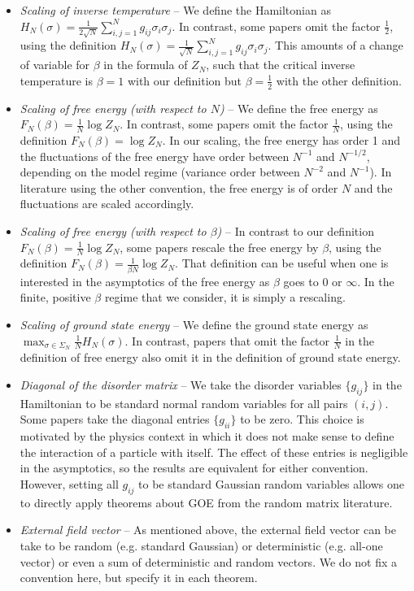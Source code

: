 \documentclass[11pt]{article}
\numberwithin{equation}{section}
\def \b {\beta}
\def \s {\sigma}
\theoremstyle{remark}
\begin{document}
\begin{itemize}
\item \textit{Scaling of inverse temperature} -- We define the Hamiltonian as $H_N(\s)=\frac1{2\sqrt N}\sum_{i,j=1}^N g_{ij}\s_i\s_j$.  In contrast, some papers omit the factor $\frac12$, using the definition $H_N(\s)=\frac1{\sqrt N}\sum_{i,j=1}^N g_{ij}\s_i\s_j$.  This amounts of a change of variable for $\b$ in the formula of $Z_N$, such that the critical inverse temperature is $\b=1$ with our definition but $\b=\frac12$ with the other definition.
\item \textit{Scaling of free energy (with respect to $N$)} -- We define the free energy as $F_N(\b)=\frac1N\log Z_N$.  In contrast, some papers omit the factor $\frac1N$, using the definition $F_N(\b)=\log Z_N$.  In our scaling, the free energy has order 1 and the fluctuations of the free energy have order between $N^{-1}$ and $N^{-1/2}$, depending on the model regime (variance order between $N^{-2}$ and $N^{-1}$).  In literature using the other convention, the free energy is of order $N$ and the fluctuations are scaled accordingly.
\item \textit{Scaling of free energy (with respect to $\b$)} -- 
In contrast to our definition $F_N(\b)=\frac1N\log Z_N$, some papers rescale the free energy by $\b$, using the definition $F_N(\b)=\frac{1}{\b N}\log Z_N$.  That definition can be useful when one is interested in the asymptotics of the free energy as $\b$ goes to 0 or $\infty$. In the finite, positive $\b$ regime that we consider, it is simply a rescaling.
\item \textit{Scaling of ground state energy} -- We define the ground state energy as $\max_{\s\in\Sigma_N}\frac1NH_N(\s)$.  In contrast, papers that omit the factor $\frac1N$ in the definition of free energy also omit it in the definition of ground state energy.
\item \textit{Diagonal of the disorder matrix} -- We take the disorder variables $\{g_{ij}\}$ in the Hamiltonian to be standard normal random variables for all pairs $(i,j)$.  Some papers take the diagonal entries $\{g_{ii}\}$ to be zero.  This choice is motivated by the physics context in which it does not make sense to define the interaction of a particle with itself.  The effect of these entries is negligible in the asymptotics, so the results are equivalent for either convention.  However, setting all $g_{ij}$ to be standard Gaussian random variables allows one to directly apply theorems about GOE from the random matrix literature.
\item \textit{External field vector} -- As mentioned above, the external field vector can be take to be random (e.g. standard Gaussian) or deterministic (e.g. all-one vector) or even a sum of deterministic and random vectors.  We do not fix a convention here, but specify it in each theorem.
\end{itemize}
\end{document}
